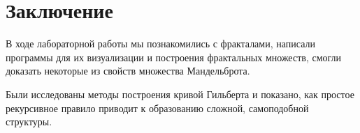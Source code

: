 \section{Заключение}

В ходе лабораторной работы мы познакомились с фракталами, написали программы для их визуализации и построения фрактальных множеств, смогли доказать некоторые из свойств множества Мандельброта.

Были исследованы методы построения кривой Гильберта и показано, как простое рекурсивное правило приводит к образованию сложной, самоподобной структуры.